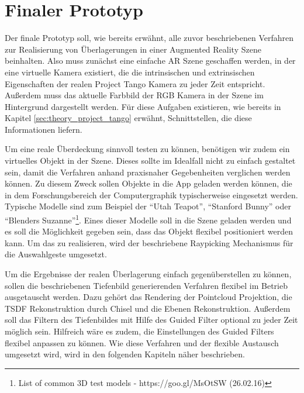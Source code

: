 \section{Finaler Prototyp} \label{sec:final_prototype}

Der finale Prototyp soll, wie bereits erwähnt, alle zuvor beschriebenen Verfahren zur Realisierung von Überlagerungen in einer Augmented Reality Szene beinhalten. Also muss zunächst eine einfache AR Szene geschaffen werden, in der eine virtuelle Kamera existiert, die die intrinsischen und extrinsischen Eigenschaften der realen Project Tango Kamera zu jeder Zeit entspricht. Außerdem muss das aktuelle Farbbild der RGB Kamera in der Szene im Hintergrund dargestellt werden. Für diese Aufgaben existieren, wie bereits in Kapitel \ref{sec:theory_project_tango} erwähnt, Schnittstellen, die diese Informationen liefern. 

Um eine reale Überdeckung sinnvoll testen zu können, benötigen wir zudem ein virtuelles Objekt in der Szene. Dieses sollte im Idealfall nicht zu einfach gestaltet sein, damit die Verfahren anhand praxisnaher Gegebenheiten verglichen werden können. Zu diesem Zweck sollen Objekte in die App geladen werden können, die in dem Forschungsbereich der Computergraphik typischerweise eingesetzt werden. Typische Modelle sind zum Beispiel der \enquote{Utah Teapot}, \enquote{Stanford Bunny} oder \enquote{Blenders Suzanne}\footnote{List of common 3D test models - https://goo.gl/MsOtSW (26.02.16)}.  Eines dieser Modelle soll in die Szene geladen werden und es soll die Möglichkeit gegeben sein, dass das Objekt flexibel positioniert werden kann. Um das zu realisieren, wird der beschriebene Raypicking Mechanismus für die Auswahlgeste umgesetzt.

Um die Ergebnisse der realen Überlagerung einfach gegenüberstellen zu können, sollen die beschriebenen Tiefenbild generierenden Verfahren flexibel im Betrieb ausgetauscht werden. Dazu gehört das Rendering der Pointcloud Projektion, die TSDF Rekonstruktion durch Chisel und die Ebenen Rekonstruktion. Außerdem soll das Filtern des Tiefenbildes mit Hilfe des Guided Filter optional zu jeder Zeit möglich sein. Hilfreich wäre es zudem, die Einstellungen des Guided Filters flexibel anpassen zu können. Wie diese Verfahren und der flexible Austausch umgesetzt wird, wird in den folgenden Kapiteln näher beschrieben.